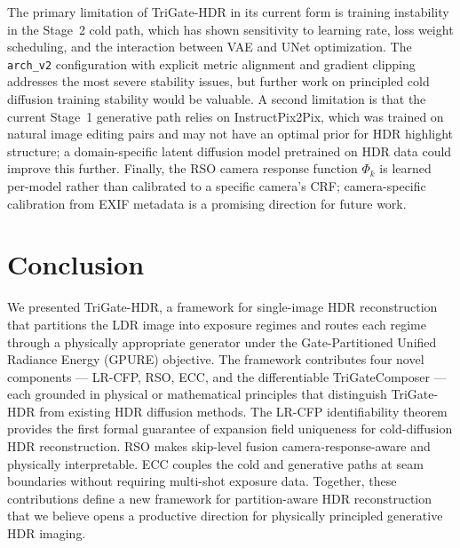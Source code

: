 \documentclass[10pt,twocolumn,letterpaper]{article}
\begin{document}
The primary limitation of TriGate-HDR in its current form is training instability in the Stage~2 cold path, which has shown sensitivity to learning rate, loss weight scheduling, and the interaction between VAE and UNet optimization. The \texttt{arch\_v2} configuration with explicit metric alignment and gradient clipping addresses the most severe stability issues, but further work on principled cold diffusion training stability would be valuable. A second limitation is that the current Stage~1 generative path relies on InstructPix2Pix, which was trained on natural image editing pairs and may not have an optimal prior for HDR highlight structure; a domain-specific latent diffusion model pretrained on HDR data could improve this further. Finally, the RSO camera response function $\Phi_k$ is learned per-model rather than calibrated to a specific camera's CRF; camera-specific calibration from EXIF metadata is a promising direction for future work.

\section{Conclusion}
\label{sec:conclusion}

We presented TriGate-HDR, a framework for single-image HDR reconstruction that partitions the LDR image into exposure regimes and routes each regime through a physically appropriate generator under the Gate-Partitioned Unified Radiance Energy (GPURE) objective. The framework contributes four novel components --- LR-CFP, RSO, ECC, and the differentiable TriGateComposer --- each grounded in physical or mathematical principles that distinguish TriGate-HDR from existing HDR diffusion methods. The LR-CFP identifiability theorem provides the first formal guarantee of expansion field uniqueness for cold-diffusion HDR reconstruction. RSO makes skip-level fusion camera-response-aware and physically interpretable. ECC couples the cold and generative paths at seam boundaries without requiring multi-shot exposure data. Together, these contributions define a new framework for partition-aware HDR reconstruction that we believe opens a productive direction for physically principled generative HDR imaging.

{\small


}
\end{document}
